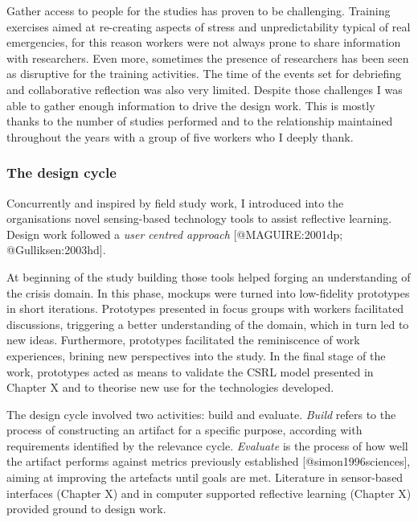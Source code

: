 Gather access to people for the studies has proven to be challenging.
Training exercises aimed at re-creating aspects of stress and
unpredictability typical of real emergencies, for this reason workers
were not always prone to share information with researchers. Even more,
sometimes the presence of researchers has been seen as disruptive for
the training activities. The time of the events set for debriefing and
collaborative reflection was also very limited. Despite those challenges
I was able to gather enough information to drive the design work. This
is mostly thanks to the number of studies performed and to the
relationship maintained throughout the years with a group of five
workers who I deeply
thank.

\subsubsection{The design cycle}\label{the-design-cycle}

Concurrently and inspired by field study work, I introduced into the
organisations novel sensing-based technology tools to assist reflective
learning. Design work followed a \emph{user centred approach}
{[}@MAGUIRE:2001dp; @Gulliksen:2003hd{]}.

At beginning of the study building those tools helped forging an
understanding of the crisis domain. In this phase, mockups were turned
into low-fidelity prototypes in short iterations. Prototypes presented
in focus groups with workers facilitated discussions, triggering a
better understanding of the domain, which in turn led to new ideas.
Furthermore, prototypes facilitated the reminiscence of work
experiences, brining new perspectives into the study. In the final stage
of the work, prototypes acted as means to validate the CSRL model
presented in Chapter X and to theorise new use for the technologies
developed.

The design cycle involved two activities: build and evaluate.
\emph{Build} refers to the process of constructing an artifact for a
specific purpose, according with requirements identified by the
relevance cycle. \emph{Evaluate} is the process of how well the artifact
performs against metrics previously established
{[}@simon1996sciences{]}, aiming at improving the artefacts until goals
are met. Literature in sensor-based interfaces (Chapter X) and in
computer supported reflective learning (Chapter X) provided ground to
design work.

